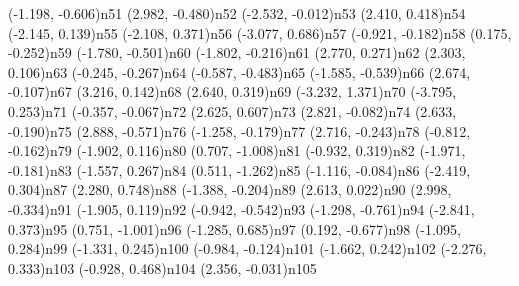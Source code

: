 \dotnode[dotstyle=Btriangle](-1.198, -0.606){n51}
\dotnode[dotstyle=Bo](2.982, -0.480){n52}
\dotnode[dotstyle=Btriangle](-2.532, -0.012){n53}
\dotnode[dotstyle=Bsquare](2.410, 0.418){n54}
\dotnode[dotstyle=Btriangle](-2.145, 0.139){n55}
\dotnode[dotstyle=Btriangle](-2.108, 0.371){n56}
\dotnode[dotstyle=Btriangle](-3.077, 0.686){n57}
\dotnode[dotstyle=Btriangle](-0.921, -0.182){n58}
\dotnode[dotstyle=Btriangle](0.175, -0.252){n59}
\dotnode[dotstyle=Btriangle](-1.780, -0.501){n60}
\dotnode[dotstyle=Btriangle](-1.802, -0.216){n61}
\dotnode[dotstyle=Bsquare](2.770, 0.271){n62}
\dotnode[dotstyle=Bsquare](2.303, 0.106){n63}
\dotnode[dotstyle=Btriangle](-0.245, -0.267){n64}
\dotnode[dotstyle=Btriangle](-0.587, -0.483){n65}
\dotnode[dotstyle=Btriangle](-1.585, -0.539){n66}
\dotnode[dotstyle=Bo](2.674, -0.107){n67}
\dotnode[dotstyle=Bsquare](3.216, 0.142){n68}
\dotnode[dotstyle=Bsquare](2.640, 0.319){n69}
\dotnode[dotstyle=Btriangle](-3.232, 1.371){n70}
\dotnode[dotstyle=Btriangle](-3.795, 0.253){n71}
\dotnode[dotstyle=Btriangle](-0.357, -0.067){n72}
\dotnode[dotstyle=Bsquare](2.625, 0.607){n73}
\dotnode[dotstyle=Bo](2.821, -0.082){n74}
\dotnode[dotstyle=Bo](2.633, -0.190){n75}
\dotnode[dotstyle=Bo](2.888, -0.571){n76}
\dotnode[dotstyle=Btriangle](-1.258, -0.179){n77}
\dotnode[dotstyle=Bo](2.716, -0.243){n78}
\dotnode[dotstyle=Btriangle](-0.812, -0.162){n79}
\dotnode[dotstyle=Btriangle](-1.902, 0.116){n80}
\dotnode[dotstyle=Bo](0.707, -1.008){n81}
\dotnode[dotstyle=Btriangle](-0.932, 0.319){n82}
\dotnode[dotstyle=Btriangle](-1.971, -0.181){n83}
\dotnode[dotstyle=Btriangle](-1.557, 0.267){n84}
\dotnode[dotstyle=Bo](0.511, -1.262){n85}
\dotnode[dotstyle=Btriangle](-1.116, -0.084){n86}
\dotnode[dotstyle=Btriangle](-2.419, 0.304){n87}
\dotnode[dotstyle=Bsquare](2.280, 0.748){n88}
\dotnode[dotstyle=Btriangle](-1.388, -0.204){n89}
\dotnode[dotstyle=Bo](2.613, 0.022){n90}
\dotnode[dotstyle=Bo](2.998, -0.334){n91}
\dotnode[dotstyle=Btriangle](-1.905, 0.119){n92}
\dotnode[dotstyle=Btriangle](-0.942, -0.542){n93}
\dotnode[dotstyle=Btriangle](-1.298, -0.761){n94}
\dotnode[dotstyle=Btriangle](-2.841, 0.373){n95}
\dotnode[dotstyle=Bo](0.751, -1.001){n96}
\dotnode[dotstyle=Btriangle](-1.285, 0.685){n97}
\dotnode[dotstyle=Btriangle](0.192, -0.677){n98}
\dotnode[dotstyle=Btriangle](-1.095, 0.284){n99}
\dotnode[dotstyle=Btriangle](-1.331, 0.245){n100}
\dotnode[dotstyle=Btriangle](-0.984, -0.124){n101}
\dotnode[dotstyle=Btriangle](-1.662, 0.242){n102}
\dotnode[dotstyle=Btriangle](-2.276, 0.333){n103}
\dotnode[dotstyle=Btriangle](-0.928, 0.468){n104}
\dotnode[dotstyle=Bo](2.356, -0.031){n105}
